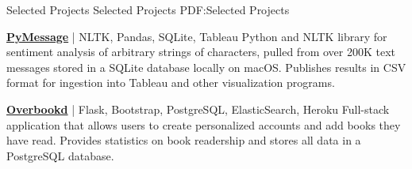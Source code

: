 \documentclass[letterpaper,MMMyyyy,nonstopmode]{simpleresumecv}
\begin{document}
\begin{Body}
\hrulefill

\clearpage

\Section
{Selected Projects}
{Selected Projects}
{PDF:Selected Projects}

\Entry
\href{https://github.com/miloszkowal/PyMessage}
{\textbf{PyMessage}} | NLTK, Pandas, SQLite, Tableau
\hfill
\Gap
Python and NLTK library for sentiment analysis of arbitrary strings of characters, pulled from over 200K text messages stored in a SQLite database locally on macOS. Publishes results in CSV format for ingestion into Tableau and other visualization programs.

\BigGap
\Entry
\href{}
{\textbf{Overbookd}} | Flask, Bootstrap, PostgreSQL, ElasticSearch, Heroku
\hfill
\Gap
Full-stack application that allows users to create personalized accounts and add books they have read. Provides statistics on book readership and stores all data in a PostgreSQL database.







\end{Body}
\end{document}
